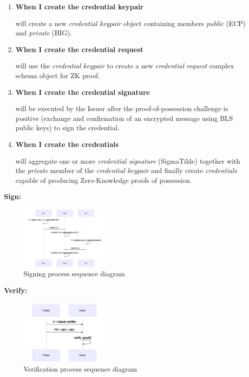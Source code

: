 \documentclass[twocolumn]{article}
\begin{document}
\begin{enumerate}

\item \textbf{When I create the credential keypair}

  will create a new \emph{credential keypair} object containing
  members \emph{public} (ECP) and \emph{private} (BIG).

\item \textbf{When I create the credential request}

  will use the \emph{credential keypair} to create a new
  \emph{credential request} complex schema object for ZK proof.

\item \textbf{When I create the credential signature}

  will be executed by the Issuer after the proof-of-possession
  challenge is positive (exchange and confirmation of an encrypted
  message using BLS public keys) to sign the credential.

\item \textbf{When I create the credentials}

  will aggregate one or more \emph{credential signature} (SigmaTilde)
  together with the \emph{private} member of the \emph{credential
    keypair} and finally create \emph{credentials} capable of
  producing Zero-Knowledge proofs of possession.

\end{enumerate}



\textbf{Sign:}

\begin{figure}
  \caption{Signing process sequence diagram}
  \centering
  \includegraphics[width=0.4\textwidth]{sign-seq}
\end{figure}

\textbf{Verify:}

\begin{figure}
  \caption{Verification process sequence diagram}
  \centering
  \includegraphics[width=0.4\textwidth]{verify-seq}
\end{figure}
\end{document}
